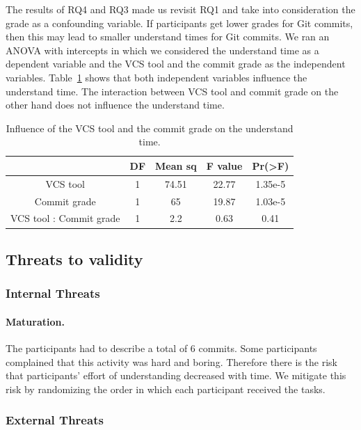 \documentclass[letterpaper]{article}
\begin{document}
The results of RQ4 and RQ3 made us revisit RQ1 and take into consideration the grade as a confounding variable.
If participants get lower grades for Git commits, then this may lead to smaller understand times for Git commits.
We ran an ANOVA with intercepts in which we considered the understand time as a dependent variable and the VCS tool and the commit grade as the independent variables.
Table~\ref{tab:rq4_anovas} shows that both independent variables influence the understand time.
The interaction between VCS tool and commit grade on the other hand does not influence the understand time.

\begin{table}[h]
	\centering
	\begin{tabular}{c | c c c c}
											& DF	&	Mean sq	&	F value	&	Pr(\textgreater F)	\\ \hline
	VCS tool 							& 1	&	74.51		&	22.77	&	1.35e-5					\\ 
	Commit grade					& 1	&	65			&	19.87	&	1.03e-5					\\
	VCS tool : Commit grade	& 1	&	2.2			&	0.63	&	0.41						\\
	\end{tabular}
	\caption{Influence of the VCS tool and the commit grade on the understand time.}
	\label{tab:rq4_anovas}
\end{table}

\subsection{Threats to validity}

\subsubsection{Internal Threats}

\paragraph{Maturation.}
The participants had to describe a total of 6 commits.
Some participants complained that this activity was hard and boring.
Therefore there is the risk that participants' effort of understanding decreased with time.
We mitigate this risk by randomizing the order in which each participant received the tasks.

\subsubsection{External Threats}
\end{document}

